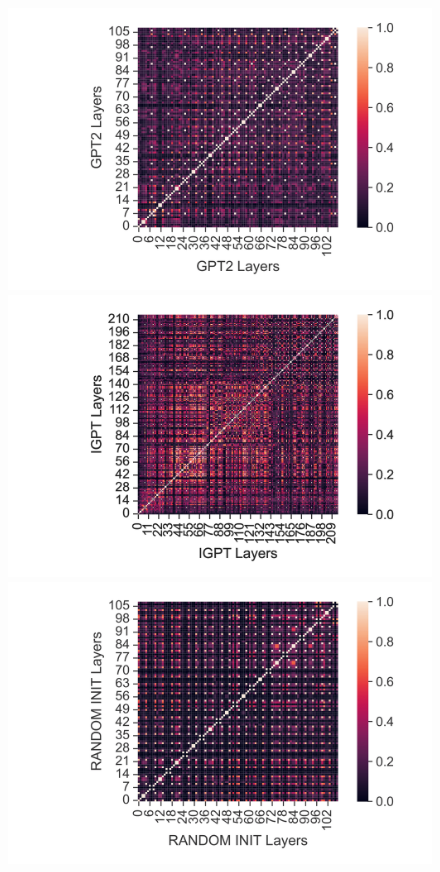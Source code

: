 \documentclass{article}
\begin{document}
\begin{figure}[H]
    \centering
    \begin{minipage}[b]{0.32\linewidth}
        \includegraphics[width=\linewidth]{figs/cka_40_40_gpt2gpt2_walker2d_medium_666_action.png}
    \end{minipage}
    \begin{minipage}[b]{0.32\linewidth}
        \includegraphics[width=\linewidth]{figs/cka_40_40_igptigpt_walker2d_medium_666_action.png}
    \end{minipage}
    \begin{minipage}[b]{0.32\linewidth}
        \includegraphics[width=\linewidth]{figs/cka_40_40_dtdt_walker2d_medium_666_action.png}

\end{minipage}
\end{figure}
\end{document}
